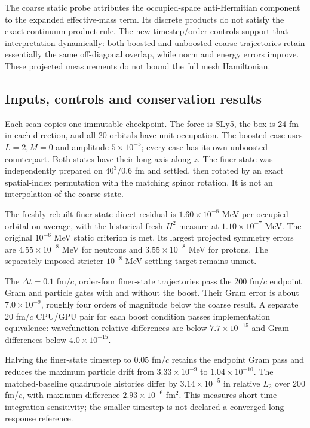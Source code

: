 \documentclass[11pt,a4paper]{article}
\begin{document}
The coarse static probe attributes the occupied-space anti-Hermitian
component to the expanded effective-mass term. Its discrete products do not
satisfy the exact continuum product rule. The new timestep/order controls
support that interpretation dynamically: both boosted and unboosted coarse
trajectories retain essentially the same off-diagonal overlap, while norm
and energy errors improve. These projected measurements do not bound the
full mesh Hamiltonian.

\subsection{Inputs, controls and conservation results}
Each scan copies one immutable checkpoint. The force is SLy5, the box is
24 fm in each direction, and all 20 orbitals have unit occupation. The
boosted case uses $L=2,M=0$ and amplitude $5\times10^{-5}$; every case has
its own unboosted counterpart. Both states have their long axis along $z$.
The finer state was independently prepared on $40^3/0.6$ fm and settled,
then rotated by an exact spatial-index permutation with the matching spinor
rotation. It is not an interpolation of the coarse state.

The freshly rebuilt finer-state direct residual is $1.60\times10^{-8}$ MeV
per occupied orbital on average, with the historical fresh $H^2$ measure
at $1.10\times10^{-7}$ MeV. The original $10^{-6}$ MeV static criterion is
met. Its largest projected symmetry errors are $4.55\times10^{-8}$ MeV
for neutrons and $3.55\times10^{-8}$ MeV for protons. The separately imposed
stricter $10^{-8}$ MeV settling target remains unmet.

The $\Delta t=0.1$ fm/$c$, order-four finer-state trajectories pass the
200 fm/$c$ endpoint Gram and particle gates with and without the boost.
Their Gram error is about $7.0\times10^{-9}$, roughly four orders of
magnitude below the coarse result. A separate 20 fm/$c$ CPU/GPU pair for
each boost condition passes implementation equivalence: wavefunction
relative differences are below $7.7\times10^{-15}$ and Gram differences
below $4.0\times10^{-15}$.

Halving the finer-state timestep to 0.05 fm/$c$ retains the endpoint Gram
pass and reduces the maximum particle drift from $3.33\times10^{-9}$ to
$1.04\times10^{-10}$. The matched-baseline quadrupole histories differ by
$3.14\times10^{-5}$ in relative $L_2$ over 200 fm/$c$, with maximum
difference $2.93\times10^{-6}$ fm$^2$. This measures short-time integration
sensitivity; the smaller timestep is not declared a converged long-response
reference.
\end{document}
